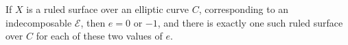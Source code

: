 If $X$ is a ruled surface over an elliptic curve $C$, corresponding to an indecomposable $\mathcal{E}$, then $e = 0$ or $-1$, and there is exactly one such ruled surface over $C$ for each of these two values of $e$.
